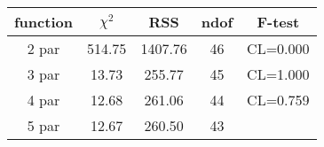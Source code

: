 \begin{tabular}{c|c|c|c|c}
function & $\chi^2$ & RSS & ndof & F-test \\
\hline
2 par & 514.75 & 1407.76 & 46 & CL=0.000 \\
3 par & 13.73 & 255.77 & 45 & CL=1.000 \\
4 par & 12.68 & 261.06 & 44 & CL=0.759 \\
5 par & 12.67 & 260.50 & 43 & \\
\hline
\end{tabular}